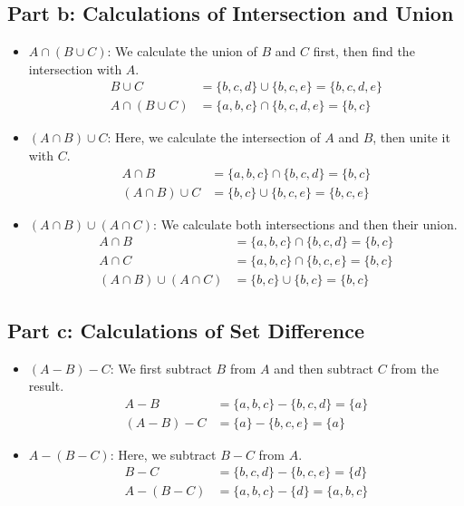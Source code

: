 \documentclass[12pt]{article}
\begin{document}
\subsection*{Part b: Calculations of Intersection and Union}
\begin{itemize}
    \item \( A \cap (B \cup C) \): We calculate the union of \( B \) and \( C \) first, then find the intersection with \( A \).
    \begin{align*}
        B \cup C &= \{ b, c, d \} \cup \{ b, c, e \} = \{ b, c, d, e \} \\
        A \cap (B \cup C) &= \{ a, b, c \} \cap \{ b, c, d, e \} = \{ b, c \}
    \end{align*}
    \item \( (A \cap B) \cup C \): Here, we calculate the intersection of \( A \) and \( B \), then unite it with \( C \).
    \begin{align*}
        A \cap B &= \{ a, b, c \} \cap \{ b, c, d \} = \{ b, c \} \\
        (A \cap B) \cup C &= \{ b, c \} \cup \{ b, c, e \} = \{ b, c, e \}
    \end{align*}
    \item \( (A \cap B) \cup (A \cap C) \): We calculate both intersections and then their union.
    \begin{align*}
        A \cap B &= \{ a, b, c \} \cap \{ b, c, d \} = \{ b, c \} \\
        A \cap C &= \{ a, b, c \} \cap \{ b, c, e \} = \{ b, c \} \\
        (A \cap B) \cup (A \cap C) &= \{ b, c \} \cup \{ b, c \} = \{ b, c \}
    \end{align*}
\end{itemize}

\subsection*{Part c: Calculations of Set Difference}
\begin{itemize}
    \item \( (A - B) - C \): We first subtract \( B \) from \( A \) and then subtract \( C \) from the result.
    \begin{align*}
        A - B &= \{ a, b, c \} - \{ b, c, d \} = \{ a \} \\
        (A - B) - C &= \{ a \} - \{ b, c, e \} = \{ a \}
    \end{align*}
    \item \( A - (B - C) \): Here, we subtract \( B - C \) from \( A \).
    \begin{align*}
        B - C &= \{ b, c, d \} - \{ b, c, e \} = \{ d \} \\
        A - (B - C) &= \{ a, b, c \} - \{ d \} = \{ a, b, c \}
    \end{align*}
\end{itemize}
\end{document}
